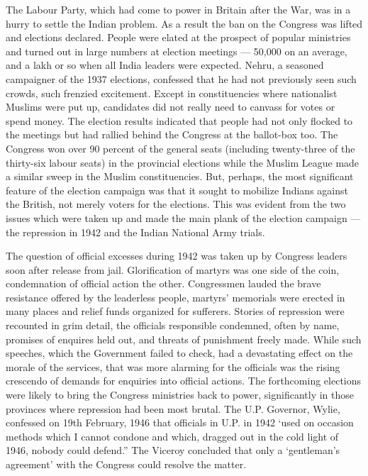 The Labour Party, which had come to power in Britain after the War, was in a hurry to settle the Indian problem. As a result the ban on the Congress was lifted and elections declared. People were elated at the prospect of popular ministries and turned out in large numbers at election meetings — 50,000 on an average, and a lakh or so when all India leaders were expected. Nehru, a seasoned campaigner of the 1937 elections, confessed that he had not previously seen such crowds, such frenzied excitement. Except in constituencies where nationalist Muslims were put up, candidates did not really need to canvass for votes or spend money. The election results indicated that people had not only flocked to the meetings but had rallied behind the Congress at the ballot-box too. The Congress won over 90 percent of the general seats (including twenty-three of the thirty-six labour seats) in the provincial elections while the Muslim League made a similar sweep in the Muslim constituencies. But, perhaps, the most significant feature of the election campaign was that it sought to mobilize Indians against the British, not merely voters for the elections. This was evident from the two issues which were taken up and made the main plank of the election campaign — the repression in 1942 and the Indian National Army trials. 

The question of official excesses during 1942 was taken up by Congress leaders soon after release from jail. Glorification of martyrs was one side of the coin, condemnation of official action the other. Congressmen lauded the brave resistance offered by the leaderless people, martyrs’ memorials were erected in many places and relief funds organized for sufferers. Stories of repression were recounted in grim detail, the officials responsible condemned, often by name, promises of enquires held out, and threats of punishment freely made. While such speeches, which the Government failed to check, had a devastating effect on the morale of the services, that was more alarming for the officials was the rising crescendo of demands for enquiries into official actions. The forthcoming elections were likely to bring the Congress ministries back to power, significantly in those provinces where repression had been most brutal. The U.P. Governor, Wylie, confessed on 19th February, 1946 that officials in U.P. in 1942 ‘used on occasion methods which I cannot condone and which, dragged out in the cold light of 1946, nobody could defend.” The Viceroy concluded that only a ‘gentleman’s agreement’ with the Congress could resolve the matter. 


